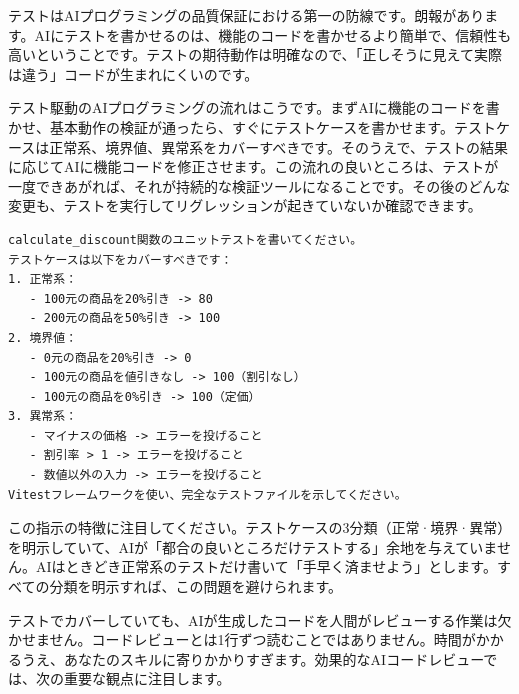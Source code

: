 


テストはAIプログラミングの品質保証における第一の防線です。朗報があります。AIにテストを書かせるのは、機能のコードを書かせるより簡単で、信頼性も高いということです。テストの期待動作は明確なので、「正しそうに見えて実際は違う」コードが生まれにくいのです。

テスト駆動のAIプログラミングの流れはこうです。まずAIに機能のコードを書かせ、基本動作の検証が通ったら、すぐにテストケースを書かせます。テストケースは正常系、境界値、異常系をカバーすべきです。そのうえで、テストの結果に応じてAIに機能コードを修正させます。この流れの良いところは、テストが一度できあがれば、それが持続的な検証ツールになることです。その後のどんな変更も、テストを実行してリグレッションが起きていないか確認できます。

\begin{lstlisting}
calculate_discount関数のユニットテストを書いてください。
テストケースは以下をカバーすべきです：
1. 正常系：
   - 100元の商品を20%引き -> 80
   - 200元の商品を50%引き -> 100
2. 境界値：
   - 0元の商品を20%引き -> 0
   - 100元の商品を値引きなし -> 100（割引なし）
   - 100元の商品を0%引き -> 100（定価）
3. 異常系：
   - マイナスの価格 -> エラーを投げること
   - 割引率 > 1 -> エラーを投げること
   - 数値以外の入力 -> エラーを投げること
Vitestフレームワークを使い、完全なテストファイルを示してください。
\end{lstlisting}

この指示の特徴に注目してください。テストケースの3分類（正常·境界·異常）を明示していて、AIが「都合の良いところだけテストする」余地を与えていません。AIはときどき正常系のテストだけ書いて「手早く済ませよう」とします。すべての分類を明示すれば、この問題を避けられます。


テストでカバーしていても、AIが生成したコードを人間がレビューする作業は欠かせません。コードレビューとは1行ずつ読むことではありません。時間がかかるうえ、あなたのスキルに寄りかかりすぎます。効果的なAIコードレビューでは、次の重要な観点に注目します。

